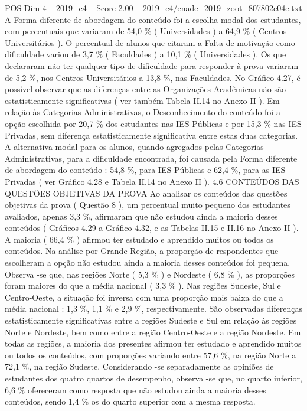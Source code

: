 \begin{textsample}{POS Dim 4 – 2019\_c4 – Score 2.00 – 2019\_c4/enade\_2019\_zoot\_807802c04e.txt}
A Forma diferente de abordagem do conteúdo foi a escolha modal dos estudantes, com percentuais que variaram de 54,0 \% ( Universidades ) a 64,9 \% ( Centros Universitários ).
O percentual de alunos que citaram a Falta de motivação como dificuldade variou de 3,7 \% ( Faculdades ) a 10,1 \% ( Universidades ).
Os que declararam não ter qualquer tipo de dificuldade para responder à prova variaram de 5,2 \%, nos Centros Universitários a 13,8 \%, nas Faculdades.
No Gráfico 4.27, é possível observar que as diferenças entre as Organizações Acadêmicas não são estatisticamente significativas ( ver também Tabela II.14 no Anexo II ).
Em relação às Categorias Administrativas, o Desconhecimento do conteúdo foi a opção escolhida por 20,7 \% dos estudantes nas IES Públicas e por 15,3 \% nas IES Privadas, sem diferença estatisticamente significativa entre estas duas categorias.
A alternativa modal para os alunos, quando agregados pelas Categorias Administrativas, para a dificuldade encontrada, foi causada pela Forma diferente de abordagem do conteúdo : 54,8 \%, para IES Públicas e 62,4 \%, para as IES Privadas ( ver Gráfico 4.28 e Tabela II.14 no Anexo II ). 4.6 CONTEÚDOS DAS QUESTÕES OBJETIVAS DA PROVA Ao analisar os conteúdos das questões objetivas da prova ( Questão 8 ), um percentual muito pequeno dos estudantes avaliados, apenas 3,3 \%, afirmaram que não estudou ainda a maioria desses conteúdos ( Gráficos 4.29 a Gráfico 4.32, e as Tabelas II.15 e II.16 no Anexo II ).
A maioria ( 66,4 \% ) afirmou ter estudado e aprendido muitos ou todos os conteúdos.
Na análise por Grande Região, a proporção de respondentes que escolheram a opção não estudou ainda a maioria desses conteúdos foi pequena.
Observa -se que, nas regiões Norte ( 5,3 \% ) e Nordeste ( 6,8 \% ), as proporções foram maiores do que a média nacional ( 3,3 \% ).
Nas regiões Sudeste, Sul e Centro-Oeste, a situação foi inversa com uma proporção mais baixa do que a média nacional : 1,3 \%, 1,1 \% e 2,9 \%, respectivamente.
São observadas diferenças estatisticamente significativas entre a regiões Sudeste e Sul em relação às regiões Norte e Nordeste, bem como entre a região Centro-Oeste e a região Nordeste.
Em todas as regiões, a maioria dos presentes afirmou ter estudado e aprendido muitos ou todos os conteúdos, com proporções variando entre 57,6 \%, na região Norte a 72,1 \%, na região Sudeste.
Considerando -se separadamente as opiniões de estudantes dos quatro quartos de desempenho, observa -se que, no quarto inferior, 6,6 \% ofereceram como resposta que não estudou ainda a maioria desses conteúdos, sendo 1,4 \% os do quarto superior com a mesma resposta.

\end{textsample}
